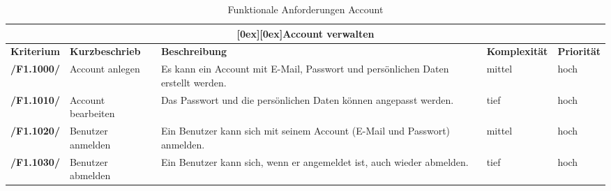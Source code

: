 \documentclass[10pt,a4paper,titlepage,twoside,german]{zhawreprt}
\newcommand{\AddRequirement}[2]{
\textbf{/#1#2/}
}
\newcommand{\F}[1]{
\AddRequirement{F1.}{#1}
}
\newcommand{\tableheader}[2]{\multicolumn{#1}{c}{\raisebox{-0.3em}[0ex][0ex]{\large{\textbf{#2}}}}}
\begin{document}
\begin{table}[ht]\centering
\begin{tabular}{l|p{2.5cm}|p{5cm}|p{2cm}|p{1.5cm}}\hline
\tableheader{5}{Account verwalten}\\[0.3em]\hline
\textbf{Kriterium} & \textbf{Kurzbeschrieb} & \textbf{Beschreibung} & \textbf{Komplexität} & \textbf{Priorität}\\\hline
\F{1000} & Account anlegen & Es kann ein Account mit E-Mail, Passwort und persönlichen Daten erstellt werden. & mittel & hoch\\\hline
\F{1010} & Account bearbeiten & Das Passwort und die persönlichen Daten können angepasst werden. & tief & hoch\\\hline
\F{1020} & Benutzer anmelden & Ein Benutzer kann sich mit seinem Account (E-Mail und Passwort) anmelden. & mittel & hoch\\\hline
\F{1030} & Benutzer abmelden & Ein Benutzer kann sich, wenn er angemeldet ist, auch wieder abmelden. & tief & hoch\\\hline
\end{tabular}
\caption{Funktionale Anforderungen Account}\label{tbl:FuncAccount}
\end{table}
\end{document}
